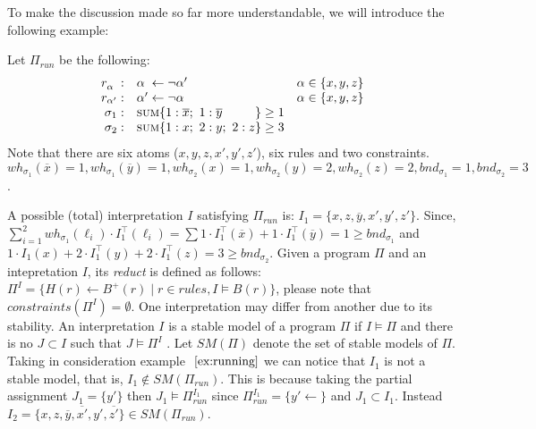 To make the discussion made so far more understandable, we will introduce the following example:
\begin{example}
    \label{ex:running}
    Let $\Pi_{\mathit{run}}$ be the following:
    \begin{align*}
        \begin{array}{rll}
            r_{\alpha\phantom{'}}: & \alpha\phantom{'} \leftarrow \neg \alpha' & \alpha \in \{x,y,z\}\\
            r_{\alpha'}: & \alpha' \leftarrow \neg \alpha & \alpha \in \{x,y,z\}\\ 
            \sigma_{1}: & \textsc{sum}\{
                1 : \overline{x};\ 1 : \overline{y}\phantom{;\ 2 : z}
            \} \geq 1 \\
            \sigma_{2}: & \textsc{sum}\{
                1 : x;\ 2 : y;\ 2 : z
            \} \geq 3
        \end{array}
    \end{align*}
Note that there are six atoms ($x,y,z,x',y',z'$), six rules and two constraints.
$\mathit{wh}_{\sigma_1}(\overline{x}) = 1, \mathit{wh}_{\sigma_1}(\overline{y}) = 1,
\mathit{wh}_{\sigma_2}(x) = 1,\mathit{wh}_{\sigma_2}(y) = 2,
\mathit{wh}_{\sigma_2}(z) = 2, \mathit{bnd}_{\sigma_1}=1,\mathit{bnd}_{\sigma_2}=3$.
\end{example}
A possible (total) interpretation $I$ satisfying $\Pi_{\mathit{run}}$ is:
$I_1 = \{ x, z, \overline{y}, x', y', z' \}$.
Since, $\sum_{i=1}^{2} \mathit{wh}_{\sigma_1}(\ell_i) \cdot I_1^{\top}(\ell_i) = 
\sum 1 \cdot I_1^{\top}(\overline{x}) + 1 \cdot I_1^{\top}(\overline{y}) = 1 \ge \mathit{bnd}_{\sigma_1}$
and $1 \cdot I_1(x) + 2 \cdot I_1^{\top}(y) + 2 \cdot I_1^{\top}(z) = 3 \ge \mathit{bnd}_{\sigma_2}$.
Given a program $\Pi$ and an intepretation $I$, its \textit{reduct} is
defined as follows: $\Pi^{I} = \{ H(r) \leftarrow B^+(r) \mid r \in \mathit{rules}, I \models B(r)\}$,
please note that $\mathit{constraints}(\Pi^{I}) = \emptyset$.
One interpretation may differ from another due to its stability.
An interpretation $I$ is a stable model of a program $\Pi$ if $I \models \Pi$ and there is 
no $J \subset I$ such that $J \models \Pi^I$ .
Let $\mathit{SM}(\Pi)$ denote the set of stable models of $\Pi$.
Taking in consideration example $~\ref{ex:running}$ we can notice that 
$I_1$ is not a stable model, that is, $I_1 \not\in \mathit{SM}(\Pi_{\mathit{run}})$.
This is because taking the partial assignment $J_1 = \{y'\}$
then $ J_1  \models \Pi_{\mathit{run}}^{I_1}$ since $\Pi_{\mathit{run}}^{I_1} = \{ y' \leftarrow  \}$
and $J_1 \subset I_1$.
Instead $I_2 = \{ x, z, \overline{y}, \overline{x'}, y', \overline{z'} \} \in \mathit{SM}(\Pi_{\mathit{run}})$.


